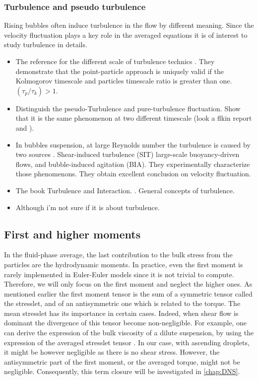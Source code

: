 \subsubsection{Turbulence and pseudo turbulence}
Rising bubbles often induce turbulence in the flow by different meaning. 
Since the velocity fluctuation plays a key role in the averaged equations it is of interest to study turbulence in details. 
\begin{itemize}
    \item The reference for the different scale of turbulence technics \citet{balachandar2009scaling}.
    They demonstrate that the point-particle approach is uniquely valid if the Kolmogorov timescale and particles timescale ratio is greater than one. $(\tau_p/\tau_k)>1$.  
    \item Distinguish the pseudo-Turbulence and pure-turbulence fluctuation. Show that it is the same phenomenon at two different timescale (look a flkin report and \citet{gemello2018modelling}\citep{mehrabadi2015pseudo}). 
    \item In bubbles suspension, at large Reynolds number the turbulence is caused by two sources \citep{risso2018agitation}. 
    Shear-induced turbulence (SIT) large-scale buoyancy-driven flows, and bubble-induced agitation (BIA). 
    They experimentally characterize those phenomenons.
    They obtain excellent  conclusion on velocity fluctuation. 
    \item The book Turbulence and Interaction. \citet{deville2009turbulence}. General concepts of turbulence. 
    \item \citet{du2022analysis} Although i'm not sure if it is about turbulence. 
\end{itemize}

\subsection{First and higher moments}
In the fluid-phase average, the last contribution to the bulk stress from the particles are the hydrodynamic moments.
In practice, even the first moment is rarely implemented in Euler-Euler models since it is not trivial to compute.
Therefore, we will only focus on the first moment and neglect the higher ones. 
As mentioned earlier the first moment tensor is the sum of a symmetric tensor called the stresslet, and of an antisymmetric one which is related to the torque.  
The mean stresslet has its importance in certain cases.
Indeed, when shear flow is dominant the divergence of this tensor become non-negligible.
For example, one can derive the expression of the bulk viscosity of a dilute suspension, by using the expression of the averaged stresslet tensor \citep{einstein1905neue}. 
In our case, with ascending droplets, it might be however negligible as there is no shear stress. However, the antisymmetric part of the first moment, or the averaged torque, might not be negligible.
Consequently, this term closure will be investigated in \ref{chap:DNS}.  







